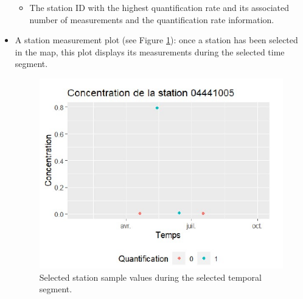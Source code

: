 \begin{itemize}
\begin{itemize}
\item The station ID with the highest quantification rate and its associated number of measurements and the quantification rate information.
\end{itemize} 
\item A station measurement plot (see Figure \ref{fig:Imapp9}): once a station has been selected in the map, this plot displays its measurements during the selected time segment. 
\begin{figure}[htbp]
 \centering
 \includegraphics[]{figs/Chap6/Im_appbis9.pdf}
 \caption{Selected station sample values during the selected temporal segment.}
 \label{fig:Imapp9}
\end{figure}
\end{itemize}



